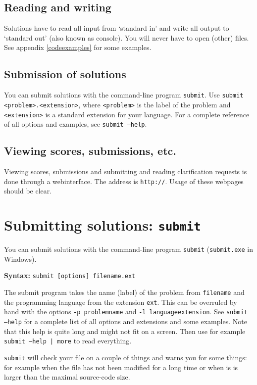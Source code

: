 \documentclass[11pt,a4paper]{article}
\newcommand{\url}[1]{\texttt{#1}}
\begin{document}
\subsection{Reading and writing}

Solutions have to read all input from `standard in' and write all
output to `standard out' (also known as console). You will never have
to open (other) files. See appendix \ref{codeexamples} for some
examples.

\subsection{Submission of solutions}

You can submit solutions with the command-line program
\texttt{submit}. Use \texttt{submit <problem>.<extension>}, where
\texttt{<problem>} is the label of the problem and
\texttt{<extension>} is a standard extension for your language.
For a complete reference of all options and examples, see
\texttt{submit --help}.

\subsection{Viewing scores, submissions, etc.}

Viewing scores, submissions and submitting and reading clarification
requests is done through a webinterface. The address is
\url{http://\WEBSERVER}. Usage of these webpages should be clear.

\newpage
\section{Submitting solutions: \texttt{submit}}\label{submit}

You can submit solutions with the command-line program
\texttt{submit} (\texttt{submit.exe} in Windows).

\textbf{Syntax:} \texttt{submit [options] filename.ext}

The submit program takes the name (label) of the problem from
\texttt{filename} and the programming language from the extension
\texttt{ext}. This can be overruled by hand with the options
\texttt{-p problemname} and \texttt{-l languageextension}.
See \texttt{submit --help} for a complete list of all options and
extensions and some examples. Note that this help is quite long and
might not fit on a screen. Then use for example
\texttt{submit --help | more} to read everything.

\texttt{submit} will check your file on a couple of things and warns
you for some things: for example when the file has not been modified
for a long time or when is is larger than the maximal source-code size.
\end{document}
